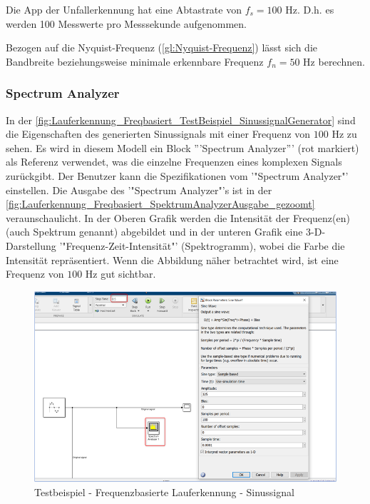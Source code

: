 Die App der Unfallerkennung hat eine Abtastrate von $f_s = 100$ Hz. D.h. es werden 100 Messwerte pro Messsekunde aufgenommen.

Bezogen auf die Nyquist-Frequenz (\autoref{gl:Nyquist-Frequenz}) lässt sich die Bandbreite beziehungsweise minimale erkennbare Frequenz $f_n = 50$ Hz berechnen.

\subsubsection{Spectrum Analyzer}
In der \autoref{fig:Lauferkennung_Freqbasiert_TestBeispiel_SinussignalGenerator} sind die Eigenschaften des generierten Sinussignals mit einer Frequenz von $100$ Hz zu sehen.
Es wird in diesem Modell ein Block '''Spectrum Analyzer''' (rot markiert) als Referenz verwendet, was die einzelne Frequenzen eines komplexen Signals zurückgibt. Der Benutzer kann die Spezifikationen vom '"Spectrum Analyzer"' einstellen. Die Ausgabe des '"Spectrum Analyzer"'s ist in der \autoref{fig:Lauferkennung_Freqbasiert_SpektrumAnalyzerAusgabe_gezoomt} veraunschaulicht. In der Oberen Grafik werden die Intensität der Frequenz(en) (auch Spektrum genannt) abgebildet und in der unteren Grafik eine 3-D-Darstellung '"Frequenz-Zeit-Intensität"' (Spektrogramm), wobei die Farbe die Intensität repräsentiert. Wenn die Abbildung näher betrachtet wird, ist eine Frequenz von $100$ Hz gut sichtbar.

\begin{figure}[H] %
	\centering
	\includegraphics[width=\linewidth]{Bilder/Lauferkennung_Freqbasiert_TestBeispiel_SinussignalGenerator.png}
	\caption{Testbeispiel - Frequenzbasierte Lauferkennung - Sinussignal}
	\label{fig:Lauferkennung_Freqbasiert_TestBeispiel_SinussignalGenerator}
\end{figure}

